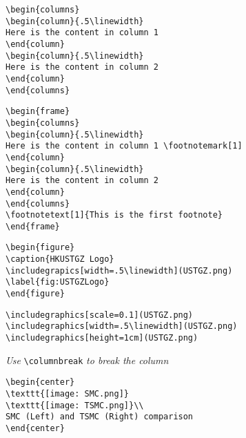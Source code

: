 \documentclass[8pt]{innovativeinnovation-cheatsheet}
\begin{document}
\begin{multicols*}{3}


\begin{lstlisting}
\begin{columns}
\begin{column}{.5\linewidth}
Here is the content in column 1
\end{column}
\begin{column}{.5\linewidth}
Here is the content in column 2
\end{column}
\end{columns}
\end{lstlisting}


\begin{lstlisting}
\begin{frame}
\begin{columns}
\begin{column}{.5\linewidth}
Here is the content in column 1 \footnotemark[1]
\end{column}
\begin{column}{.5\linewidth}
Here is the content in column 2
\end{column}
\end{columns}
\footnotetext[1]{This is the first footnote}
\end{frame}
\end{lstlisting}




\begin{lstlisting}
\begin{figure}
\caption{HKUSTGZ Logo}
\includegrapics[width=.5\linewidth](USTGZ.png)
\label{fig:USTGZLogo}
\end{figure}
\end{lstlisting}


\begin{lstlisting}
\includegraphics[scale=0.1](USTGZ.png)
\includegraphics[width=.5\linewidth](USTGZ.png)
\includegraphics[height=1cm](USTGZ.png)
\end{lstlisting}

\vfill

\textit{Use} \verb|\columnbreak| \textit{to break the column}

\columnbreak

\begin{lstlisting}
\begin{center}
\texttt{[image: SMC.png]}
\texttt{[image: TSMC.png]}\\
SMC (Left) and TSMC (Right) comparison
\end{center}
\end{lstlisting}



\end{multicols*}
\end{document}
